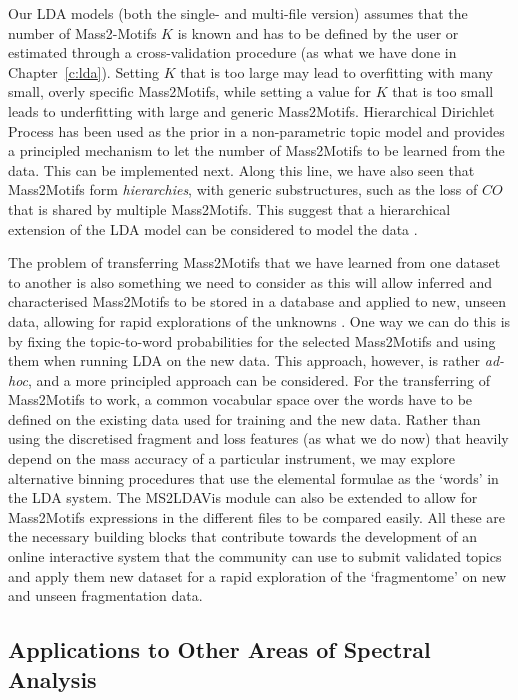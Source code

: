Our LDA models (both the single- and multi-file version) assumes that the number of Mass2-Motifs $K$ is known and has to be defined by the user or estimated through a cross-validation procedure (as what we have done in Chapter~\ref{c:lda}). Setting $K$ that is too large may lead to overfitting with many small, overly specific Mass2Motifs, while setting a value for $K$ that is too small leads to underfitting with large and generic Mass2Motifs. Hierarchical Dirichlet Process has been used as the prior in a non-parametric topic model \cite{teh2012hierarchical} and provides a principled mechanism to let the number of Mass2Motifs to be learned from the data. This can be implemented next. Along this line, we have also seen that Mass2Motifs form \emph{hierarchies}, with generic substructures, such as the loss of $CO$ that is shared by multiple Mass2Motifs. This suggest that a hierarchical extension of the LDA model can be considered to model the data \cite{griffiths2004hierarchical}. 

The problem of transferring Mass2Motifs that we have learned from one dataset to another is also something we need to consider as this will allow inferred and characterised Mass2Motifs to be stored in a database and applied to new, unseen data, allowing for rapid explorations of the unknowns . One way we can do this is by fixing the topic-to-word probabilities for the selected Mass2Motifs and using them when running LDA on the new data. This approach, however, is rather \textit{ad-hoc}, and a more principled approach can be considered. For the transferring of Mass2Motifs to work, a common vocabular space over the words have to be defined on the existing data used for training and the new data. Rather than using the discretised fragment and loss features (as what we do now) that heavily depend on the mass accuracy of a particular instrument, we may explore alternative binning procedures that use the elemental formulae as the `words' in the LDA system. The MS2LDAVis module can also be extended to allow for Mass2Motifs expressions in the different files to be compared easily. All these are the necessary building blocks that contribute towards the development of an online interactive system that the community can use to submit validated topics and apply them new dataset for a rapid exploration of the `fragmentome' on new and unseen fragmentation data.

\subsection{Applications to Other Areas of Spectral Analysis}

